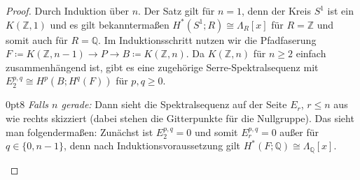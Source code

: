 \documentclass[11pt, a4paper, german]{article}
\theoremstyle{definition}
\theoremstyle{remark}
\newcommand{\Z}{\mathbb{Z}} %
\newcommand{\Q}{\mathbb{Q}} %
\newcommand{\zeroDot}[2]{\node[draw,circle,inner sep=0.4pt,fill] at (#1,#2) {};} %
\begin{document}
\begin{proof}
  Durch Induktion über $n$.
  Der Satz gilt für $n = 1$, denn der Kreis $S^1$ ist ein $K(\Z, 1)$ und es gilt bekanntermaßen $H^*(S^1; R) \cong \Lambda_R[x]$ für $R = \Z$ und somit auch für $R = \Q$.
  Im Induktionsschritt nutzen wir die Pfadfaserung $F \coloneqq K(\Z, n{-}1) \to P \to B \coloneqq K(\Z, n)$. Da $K(\Z, n)$ für $n \geq 2$ einfach zusammenhängend ist, gibt es eine zugehörige Serre-Spektralsequenz mit
  $E_2^{p,q} \cong H^p(B; H^q(F))$ für $p, q \geq 0$.

  \vspace{0.5cm}

  \renewcommand\windowpagestuff{
    \begin{center}\begin{tikzpicture}[x=16pt,y=16pt]\begin{scope}[shift={(0,0)}]
      \foreach \x in {1,2,3,5,6,7}{
        \foreach \y in {0,1,...,3}{
          \zeroDot{\x}{\y}
        }
      }
      \foreach \x in {0,...,8}{
        \zeroDot{\x}{4}
      }
      \foreach \y in {0,...,4}{
        \node at (9.5,\y) {$\cdots$};
      }
      \node at (0,0) {$\Q$\small $1$};
      \zeroDot{0}{1}
      \zeroDot{0}{2}
      \node at (0,3) {$\Q$\small $a$};
      \node at (4,0) {$\Q$\small $x$};
      \zeroDot{4}{1}
      \zeroDot{4}{2}
      \node at (4,3) {$\Q$\small $ax$};
      \draw[->,gray] (0.6,2.6) -- (3.4,0.4);
      \node at (8,0) {$\Q$\small $x^2$};
      \zeroDot{8}{1}
      \zeroDot{8}{2}
      \node at (8,3) {$\Q$\small $ax^2$};
      \draw[->,gray] (4.6,2.6) -- (7.4,0.4);
      \draw[->] (-0.7,-0.6) -- (10.3,-0.6); %
      \draw[->] (-0.7,-0.6) -- (-0.7,4.5); %
      \node[left] at (-0.7,0) {$0$};
      \node[left] at (-0.9,1.7) {\vdots};
      \node[left] at (-0.7,3) {$n{-}1$};
      \node[below] at (0,-0.6) {$0$};
      \node[below] at (2,-0.7) {$\cdots$};
      \node[below] at (4,-0.7) {$n$};
      \node[below] at (6,-0.7) {$\cdots$};
      \node[below] at (8,-0.6) {$2n$};
      \node[below] at (9.5,-0.7) {$\cdots$};
    \end{scope}\end{tikzpicture}\end{center}
  }
  \opencutright
  \begin{cutout}{0}{\dimexpr\linewidth-8cm\relax}{0pt}{8}
    \emph{Falls $n$ gerade:} \enspace
    Dann sieht die Spektralsequenz auf der Seite $E_r$, $r \leq n$ aus wie rechts skizziert (dabei stehen die Gitterpunkte für die Nullgruppe).
    Das sieht man folgendermaßen: Zunächst ist $E_2^{p,q} = 0$ und somit $E_r^{p,q} = 0$ außer für $q \in \{ 0, n{-}1 \}$, denn nach Induktionsvoraussetzung gilt $H^*(F; \Q) \cong \Lambda_\Q[x]$.

\end{cutout}
\end{proof}
\end{document}
